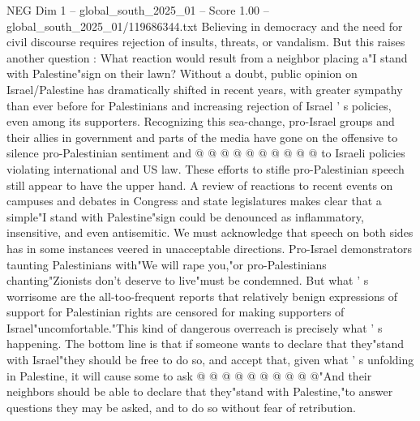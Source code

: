 \begin{textsample}{NEG Dim 1 – global\_south\_2025\_01 – Score 1.00 – global\_south\_2025\_01/119686344.txt}
Believing in democracy and the need for civil discourse requires rejection of insults, threats, or vandalism.
But this raises another question : What reaction would result from a neighbor placing a"I stand with Palestine"sign on their lawn?
Without a doubt, public opinion on Israel/Palestine has dramatically shifted in recent years, with greater sympathy than ever before for Palestinians and increasing rejection of Israel ' s policies, even among its supporters.
Recognizing this sea-change, pro-Israel groups and their allies in government and parts of the media have gone on the offensive to silence pro-Palestinian sentiment and @ @ @ @ @ @ @ @ @ @ to Israeli policies violating international and US law.
These efforts to stifle pro-Palestinian speech still appear to have the upper hand.
A review of reactions to recent events on campuses and debates in Congress and state legislatures makes clear that a simple"I stand with Palestine"sign could be denounced as inflammatory, insensitive, and even antisemitic.
We must acknowledge that speech on both sides has in some instances veered in unacceptable directions.
Pro-Israel demonstrators taunting Palestinians with"We will rape you,"or pro-Palestinians chanting"Zionists don't deserve to live"must be condemned.
But what ' s worrisome are the all-too-frequent reports that relatively benign expressions of support for Palestinian rights are censored for making supporters of Israel"uncomfortable."This kind of dangerous overreach is precisely what ' s happening.
The bottom line is that if someone wants to declare that they"stand with Israel"they should be free to do so, and accept that, given what ' s unfolding in Palestine, it will cause some to ask @ @ @ @ @ @ @ @ @ @"And their neighbors should be able to declare that they"stand with Palestine,"to answer questions they may be asked, and to do so without fear of retribution.

\end{textsample}
